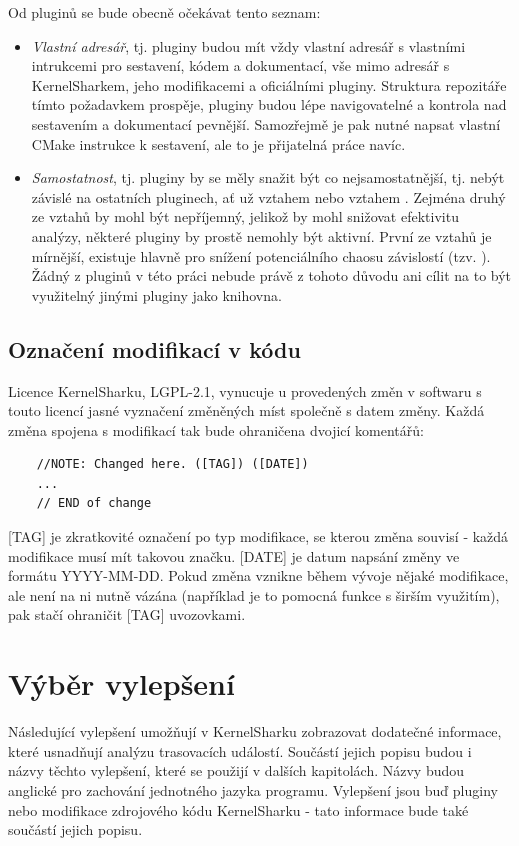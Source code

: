 Od pluginů se bude obecně očekávat tento seznam:
\begin{itemize}
    \item \emph{Vlastní adresář}, tj. pluginy budou mít vždy vlastní adresář s vlastními intrukcemi pro sestavení, kódem a dokumentací, vše mimo adresář s KernelSharkem, jeho modifikacemi a oficiálními pluginy. Struktura repozitáře tímto požadavkem prospěje, pluginy budou lépe navigovatelné a kontrola nad sestavením a dokumentací pevnější. Samozřejmě je pak nutné napsat vlastní CMake instrukce k sestavení, ale to je přijatelná práce navíc.
    \item \emph{Samostatnost}, tj. pluginy by se měly snažit být co nejsamostatnější, tj. nebýt závislé na ostatních pluginech, ať už vztahem  nebo vztahem . Zejména druhý ze vztahů by mohl být nepříjemný, jelikož by mohl snižovat efektivitu analýzy, některé pluginy by prostě nemohly být aktivní. První ze vztahů je mírnější, existuje hlavně pro snížení potenciálního chaosu závislostí (tzv. ). Žádný z pluginů v této práci nebude právě z tohoto důvodu ani cílit na to být využitelný jinými pluginy jako knihovna.
\end{itemize}

\subsection{Označení modifikací v kódu}
Licence KernelSharku, LGPL-2.1, vynucuje u provedených změn v softwaru s touto licencí jasné vyznačení změněných míst společně s datem změny. Každá změna spojena s modifikací tak bude ohraničena dvojicí komentářů:
\begin{verbatim}
    //NOTE: Changed here. ([TAG]) ([DATE])
    ...
    // END of change
\end{verbatim}
[TAG] je zkratkovité označení po typ modifikace, se kterou změna souvisí - každá modifikace musí mít takovou značku. [DATE] je datum napsání změny ve formátu YYYY-MM-DD. Pokud změna vznikne během vývoje nějaké modifikace, ale není na ni nutně vázána (například je to pomocná funkce s širším využitím), pak stačí ohraničit [TAG] uvozovkami.

\section{Výběr vylepšení}
Následující vylepšení umožňují v KernelSharku zobrazovat dodatečné informace, které usnadňují analýzu trasovacích událostí. Součástí jejich popisu budou i názvy těchto vylepšení, které se použijí v dalších kapitolách. Názvy budou anglické pro zachování jednotného jazyka programu. Vylepšení jsou buď pluginy nebo modifikace zdrojového kódu KernelSharku - tato informace bude také součástí jejich popisu.


